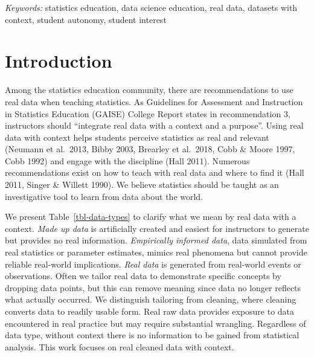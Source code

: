 \documentclass[
  12pt]{article}
\begin{document}
\noindent%
{\it Keywords:} statistics education, data science education, real
data, datasets with context, student autonomy, student interest
\vfill

\newpage
{} %

\section{Introduction}\label{sec-introduction}

Among the statistics education community, there are recommendations to
use real data when teaching statistics. As Guidelines for Assessment and
Instruction in Statistics Education (GAISE) College Report
\citeyearpar{gaise2016} states in recommendation 3, instructors should
``integrate real data with a context and a purpose''. Using real data
with context helps students perceive statistics as real and relevant
(Neumann et al.~2013, Bibby 2003, Brearley et al.~2018, Cobb \& Moore
1997, Cobb 1992) and engage with the discipline (Hall 2011). Numerous
recommendations exist on how to teach with real data and where to find
it (Hall 2011, Singer \& Willett 1990). We believe statistics should be
taught as an investigative tool to learn from data about the world.

We present Table~\ref{tbl-data-types} to clarify what we mean by real
data with a context. \emph{Made up data} is artificially created and
easiest for instructors to generate but provides no real information.
\emph{Empirically informed data}, data simulated from real statistics or
parameter estimates, mimics real phenomena but cannot provide reliable
real-world implications. \emph{Real data} is generated from real-world
events or observations. Often we tailor real data to demonstrate
specific concepts by dropping data points, but this can remove meaning
since data no longer reflects what actually occurred. We distinguish
tailoring from cleaning, where cleaning converts data to readily usable
form. Real raw data provides exposure to data encountered in real
practice but may require substantial wrangling. Regardless of data type,
without context there is no information to be gained from statistical
analysis. This work focuses on real cleaned data with context.
\end{document}
